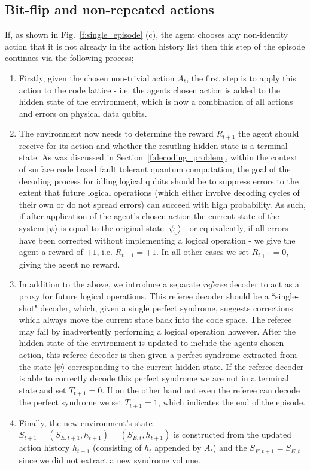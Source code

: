 \documentclass[twocolumn,preprintnumbers,amsmath,amssymb,notitlepage,nofootinbib,longbibliography,superscriptaddress,aps,pra,10pt]{revtex4-1}
\begin{document}
  \subsection{Bit-flip and non-repeated actions}
	If, as shown in Fig.~\ref{f:single_episode} (c), the agent chooses any non-identity action that it is not already in the action history list
	then this step of the episode continues via the following process;

	\begin{enumerate}
		\item Firstly, given the chosen non-trivial action $A_t$, the first step is to apply this action to the code lattice - i.e. the agents chosen action is added to the hidden
		state of the environment, which is now a combination of all actions and errors on physical data qubits.
		\item The environment now needs to determine the reward $R_{t+1}$ the agent should receive for its action and whether the resutling hidden state is a terminal state.
		As was discussed in Section~\ref{f:decoding_problem}, within the context of surface code based fault tolerant quantum computation, the goal of the decoding process for idling
		logical qubits should be to suppress errors to the extent that future logical operations (which either involve decoding cycles of their own or do not spread errors) can succeed
		with high probability. As such, if after application of the agent's chosen action the current state of the system $|\psi\rangle$ is equal to the original state $|\psi_0\rangle$ -
		or equivalently, if all errors have been corrected without implementing a logical operation - we give the agent a reward of $+1$, i.e. $R_{t+1} = +1$.
		In all other cases we set $R_{t+1} = 0$, giving the agent no reward.
		\item In addition to the above, we introduce a separate \textit{referee} decoder to act as a proxy for future logical operations. This referee decoder should be a
		``single-shot" decoder, which, given a single perfect syndrome, suggests corrections which always move the current state back into the code space. The referee may fail by
		inadvertently performing a logical operation however. After the hidden state of the environment is updated to include the agents chosen action, this referee decoder is then
		given a perfect syndrome extracted from the state $|\psi\rangle$ corresponding to the current hidden state. If the referee decoder is able to correctly decode this perfect syndrome
		we are not in a terminal state and set $T_{t+1} = 0$. If on the other hand not even the referee can decode the perfect syndrome we set $T_{t+1}=1$, which indicates the end of the episode.
		\item Finally, the new environment's state $S_{t+1} = (S_{E,t+1},h_{t+1}) = (S_{E,t},h_{t+1})$ is constructed from the updated action history $h_{t+1}$ (consisting of $h_t$ appended by
		$A_t$) and the $S_{E,t+1} = S_{E,t}$ since we did not extract a new syndrome volume.
	\end{enumerate}
\end{document}
